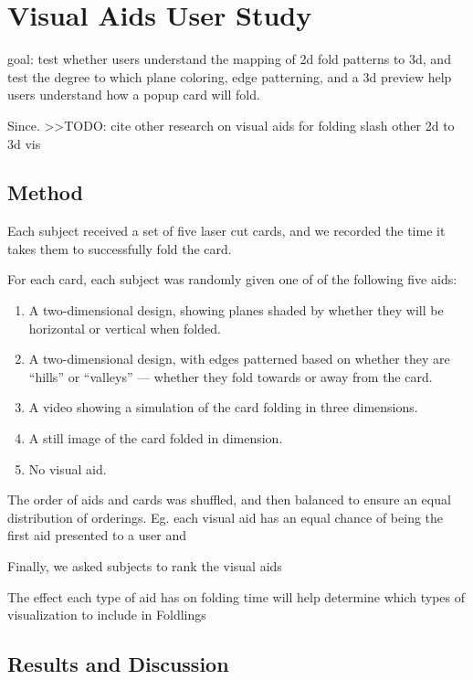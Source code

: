\section{Visual Aids User Study}\label{visual-aids-user-study}

goal: test whether users understand the mapping of 2d fold patterns to
3d, and test the degree to which plane coloring, edge patterning, and a
3d preview help users understand how a popup card will fold.

Since. \textgreater{}\textgreater{}TODO: cite other research on visual
aids for folding slash other 2d to 3d vis

\subsection{Method}\label{method}

Each subject received a set of five laser cut cards, and we recorded the
time it takes them to successfully fold the card.

For each card, each subject was randomly given one of of the following
five aids:

\begin{enumerate}
\def\labelenumi{\arabic{enumi})}
\itemsep1pt\parskip0pt
\item
  A two-dimensional design, showing planes shaded by whether they will
  be horizontal or vertical when folded.
\item
  A two-dimensional design, with edges patterned based on whether they
  are ``hills'' or ``valleys'' --- whether they fold towards or away
  from the card.
\item
  A video showing a simulation of the card folding in three dimensions.
\item
  A still image of the card folded in dimension.
\item
  No visual aid.
\end{enumerate}

The order of aids and cards was shuffled, and then balanced to ensure an
equal distribution of orderings. Eg. each visual aid has an equal chance
of being the first aid presented to a user and

Finally, we asked subjects to rank the visual aids

The effect each type of aid has on folding time will help determine
which types of visualization to include in Foldlings

\subsection{Results and Discussion}\label{results-and-discussion}
